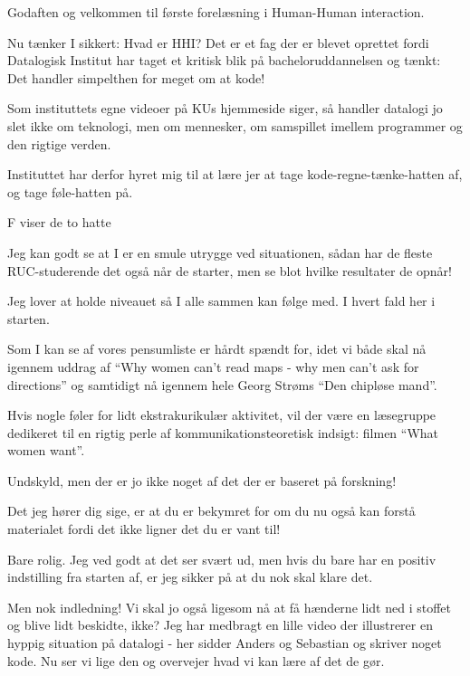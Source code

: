 \documentclass[a4paper,11pt]{article}
\begin{document}
  \begin{sketch}
      
 Godaften og velkommen til første forelæsning i Human-Human interaction.

 Nu tænker I sikkert: Hvad er HHI? Det er et fag der er blevet oprettet fordi Datalogisk Institut har taget et kritisk blik på bacheloruddannelsen og tænkt: Det handler simpelthen for meget om at kode!

 Som instituttets egne videoer på KUs hjemmeside siger, så
handler datalogi jo slet ikke om teknologi, men om mennesker, om
 samspillet imellem programmer og den rigtige verden.

 Instituttet har derfor hyret mig til at lære jer at tage kode-regne-tænke-hatten af, og tage føle-hatten på.

\scene F viser de to hatte

 Jeg kan godt se at I er en smule utrygge ved situationen, sådan har de fleste RUC-studerende det også når de starter, men se blot hvilke resultater de opnår!

 Jeg lover at holde niveauet så I alle sammen kan følge med. I hvert fald her i starten.

 Som I kan se af vores pensumliste er hårdt spændt for, idet vi både skal nå igennem uddrag af ``Why women can't read maps - why men can't ask for directions'' og samtidigt nå igennem hele Georg Strøms ``Den chipløse mand''.

 Hvis nogle føler for lidt ekstrakurikulær aktivitet, vil der være en læsegruppe dedikeret til en rigtig perle af kommunikationsteoretisk indsigt: filmen ``What women want''.

 Undskyld, men der er jo ikke noget af det der er baseret på forskning!

 Det jeg hører dig sige, er at du er bekymret for om du nu også
kan forstå materialet fordi det ikke ligner det du er vant til!

 Bare rolig. Jeg ved godt at det ser svært ud, men hvis du bare har en positiv indstilling fra starten af, er jeg sikker på at du nok skal klare det.

 Men nok indledning! Vi skal jo også ligesom nå at få hænderne lidt ned i stoffet og blive lidt beskidte, ikke? Jeg har medbragt en lille video der illustrerer en hyppig situation på datalogi - her sidder
Anders og Sebastian og skriver noget kode. Nu ser vi lige den og
overvejer hvad vi kan lære af det de gør.


\end{sketch}
\end{document}
